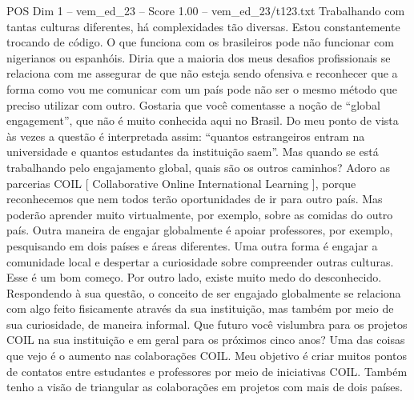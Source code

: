 \begin{textsample}{POS Dim 1 – vem\_ed\_23 – Score 1.00 – vem\_ed\_23/t123.txt}
Trabalhando com tantas culturas diferentes, há complexidades tão diversas.
Estou constantemente trocando de código.
O que funciona com os brasileiros pode não funcionar com nigerianos ou espanhóis.
Diria que a maioria dos meus desafios profissionais se relaciona com me assegurar de que não esteja sendo ofensiva e reconhecer que a forma como vou me comunicar com um país pode não ser o mesmo método que preciso utilizar com outro.
Gostaria que você comentasse a noção de “global engagement”, que não é muito conhecida aqui no Brasil.
Do meu ponto de vista às vezes a questão é interpretada assim: “quantos estrangeiros entram na universidade e quantos estudantes da instituição saem”.
Mas quando se está trabalhando pelo engajamento global, quais são os outros caminhos?
Adoro as parcerias COIL [ Collaborative Online International Learning ], porque reconhecemos que nem todos terão oportunidades de ir para outro país.
Mas poderão aprender muito virtualmente, por exemplo, sobre as comidas do outro país.
Outra maneira de engajar globalmente é apoiar professores, por exemplo, pesquisando em dois países e áreas diferentes.
Uma outra forma é engajar a comunidade local e despertar a curiosidade sobre compreender outras culturas.
Esse é um bom começo.
Por outro lado, existe muito medo do desconhecido.
Respondendo à sua questão, o conceito de ser engajado globalmente se relaciona com algo feito fisicamente através da sua instituição, mas também por meio de sua curiosidade, de maneira informal.
Que futuro você vislumbra para os projetos COIL na sua instituição e em geral para os próximos cinco anos?
Uma das coisas que vejo é o aumento nas colaborações COIL.
Meu objetivo é criar muitos pontos de contatos entre estudantes e professores por meio de iniciativas COIL.
Também tenho a visão de triangular as colaborações em projetos com mais de dois países.

\end{textsample}
